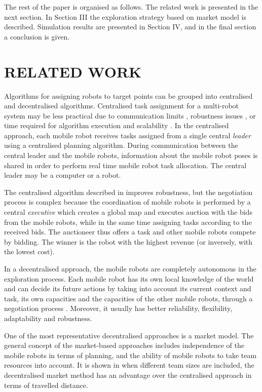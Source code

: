 \documentclass[letterpaper, 10 pt, conference]{ieeeconf}  %
\begin{document}
The rest of the paper is organised as follows. The related work is presented in the next section. In Section III the exploration strategy based on market model is described. Simulation results are presented in Section IV, and in the final section a conclusion is given.

\section{RELATED WORK}

Algorithms for assigning robots to target points can be grouped into centralised and decentralised algorithms. 
Centralised task assignment for a multi-robot system may be less practical due to communication limits \cite{free-market}, robustness issues \cite{survey-analysis}, or time required for algorithm execution and scalability \cite{Julia}. In the centralised approach, each mobile robot receives tasks assigned from a single central \emph{leader} using a centralised planning algorithm. During communication between the central leader and the mobile robots, information about the mobile robot poses is shared in order to perform real time mobile robot task allocation. The central leader may be a computer or a robot.

The centralised algorithm described in \cite{burgard} improves robustness, but the negotiation process is complex because the coordination of mobile robots is performed by a central \emph{executive} which creates a global map and executes auction with the  bids from the mobile robots, while in the same time assigning tasks according to the received bids. The auctioneer thus offers a task and other mobile robots compete by bidding. The winner is the robot with the highest revenue (or inversely, with the lowest cost).

In a decentralised approach, the mobile robots are completely autonomous in the exploration process. Each mobile robot has its own local knowledge of the world and can decide its future actions by taking into account its current context and task, its own capacities and the capacities of the other mobile robots, through a negotiation process \cite{Yan}. Moreover, it usually has better reliability, flexibility, adaptability and robustness. 

One of the most representative decentralised approaches is a market model.
The general concept of the market-based approaches includes independence of the mobile robots in terms of planning, and the ability of mobile robots to take team resources into account. It is shown in \cite{usporedba} when different team sizes are included, the decentralised market method has an advantage over the centralised approach in terms of travelled distance.
\end{document}
